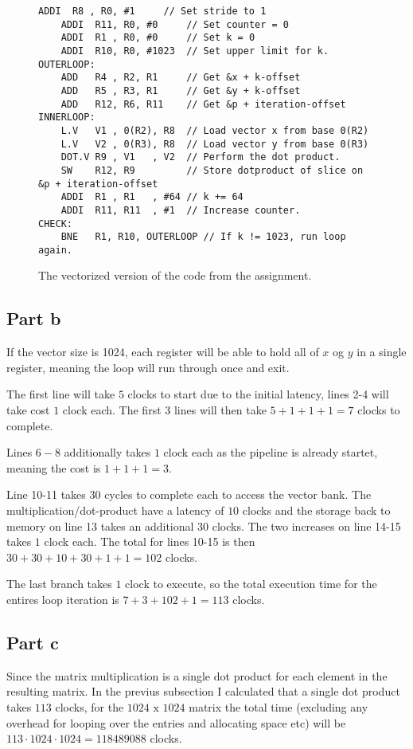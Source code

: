 \begin{figure}[ht]
    \begin{lstlisting}[language={[x86masm]Assembler}]
    ADDI  R8 , R0, #1     // Set stride to 1
    ADDI  R11, R0, #0     // Set counter = 0
    ADDI  R1 , R0, #0     // Set k = 0
    ADDI  R10, R0, #1023  // Set upper limit for k.
OUTERLOOP:
    ADD   R4 , R2, R1     // Get &x + k-offset
    ADD   R5 , R3, R1     // Get &y + k-offset
    ADD   R12, R6, R11    // Get &p + iteration-offset
INNERLOOP:
    L.V   V1 , 0(R2), R8  // Load vector x from base 0(R2)
    L.V   V2 , 0(R3), R8  // Load vector y from base 0(R3)
    DOT.V R9 , V1   , V2  // Perform the dot product.
    SW    R12, R9         // Store dotproduct of slice on &p + iteration-offset
    ADDI  R1 , R1   , #64 // k += 64
    ADDI  R11, R11  , #1  // Increase counter.
CHECK:
    BNE   R1, R10, OUTERLOOP // If k != 1023, run loop again.
    \end{lstlisting}
    \caption{The vectorized version of the code from the assignment.}
    \label{fig:t22acode}
\end{figure}

\subsection{Part b}

If the vector size is 1024, each register will be able to hold all of $x$ og $y$
in a single register, meaning the loop will run through once and exit.

The first line will take $5$ clocks to start due to the initial latency, lines
2-4 will take cost $1$ clock each. The first 3 lines will then take
$5+1+1+1 = 7$ clocks to complete.

Lines $6-8$ additionally takes $1$ clock each as the pipeline is already
startet, meaning the cost is $1+1+1 = 3$.

Line 10-11 takes $30$ cycles to complete each to access the vector bank. The
multiplication/dot-product have a latency of $10$ clocks and the storage back
to memory on line 13 takes an additional $30$ clocks. The two increases on
line 14-15 takes $1$ clock each. The total for lines 10-15 is then
$30+30+10+30+1+1 = 102$ clocks.

The last branch takes $1$ clock to execute, so the total execution time for the
entires loop iteration is $7 + 3 + 102 + 1 = 113$ clocks.


\subsection{Part c}

Since the matrix multiplication is a single dot product for each element in the
resulting matrix. In the previus subsection I calculated that a single dot
product takes $113$ clocks, for the $1024 \text{ x } 1024$ matrix the total time
(excluding any overhead for looping over the entries and allocating space etc)
will be $113 \cdot 1024 \cdot 1024 = 118489088$ clocks.

